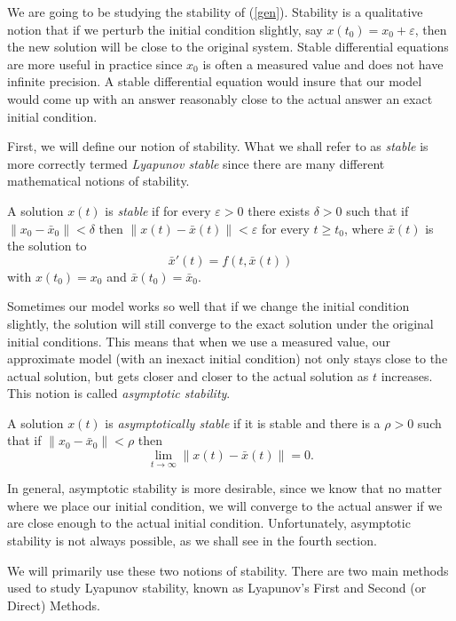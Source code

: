 \documentclass[12pt]{article}
\def\a{for every }
\def\e{there exists }
\def\eps{\varepsilon}
\def\bx{\bar{x}}
\begin{document}
We are going to be studying the stability of (\ref{gen}).  Stability
is a qualitative notion that if we perturb the initial condition
slightly, say $x(t_0) = x_0 + \eps$, then the new solution will be
close to the original system.  Stable differential equations are more
useful in practice since $x_0$ is often a  measured value and does
not have infinite precision.  A stable differential equation would
insure that our model would come up with an answer reasonably close to
the actual answer an exact initial condition.

First, we will define our notion of stability.  What we shall refer to
as {\em stable} is more correctly termed {\em Lyapunov stable} since
there are many different mathematical notions of stability.

\begin{dfn}
  	A solution $x(t)$ is {\em stable} if \a $\eps >0$
	\e $\delta > 0$ such that if $\| x_0 - \bx_0 \| < \delta$ then
	$\| x(t) - \bx(t) \| < \eps$ \a $t \ge t_0$, where $\bx(t)$ is
	the solution to
	$$\bx'(t) = f(t, \bx(t))$$
with $x(t_0) = x_0$ and $\bx(t_0) = \bx_0$.
\end{dfn}

Sometimes our model works so well that if we change the initial
condition slightly, the solution will still converge to the exact
solution under the original initial conditions.  This means that when
we use a measured value, our approximate model (with an inexact
initial condition) not only stays close to the actual solution, but
gets closer and closer to the actual solution as $t$ increases.  This
notion is called {\em asymptotic stability}.

\begin{dfn}
	A solution $x(t)$ is {\em asymptotically stable} if it is stable
	and there is a $\rho > 0$ such that if $\| x_0 - \bx_0 \| < \rho$
	then 
$$\lim_{t \rightarrow \infty} \| x(t) - \bx(t) \| = 0.$$
\end{dfn}

In general, asymptotic stability is more desirable, since we know that
no matter where we place our initial condition, we will converge to
the actual answer if we are close enough to the actual initial
condition.  Unfortunately, asymptotic stability is not always
possible, as we shall see in the fourth section.

We will primarily use these two notions of stability.  There
are two main methods used to study Lyapunov stability, known
as Lyapunov's First and Second (or Direct) Methods.
\end{document}
